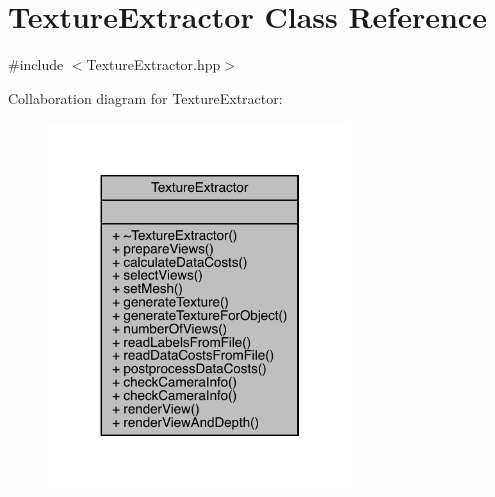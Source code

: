 \hypertarget{class_texture_extractor}{}\section{Texture\+Extractor Class Reference}
\label{class_texture_extractor}


{\ttfamily \#include $<$Texture\+Extractor.\+hpp$>$}



Collaboration diagram for Texture\+Extractor\+:\nopagebreak
\begin{figure}[H]
\begin{center}
\leavevmode
\includegraphics[width=227pt]{class_texture_extractor__coll__graph}
\end{center}
\end{figure}
